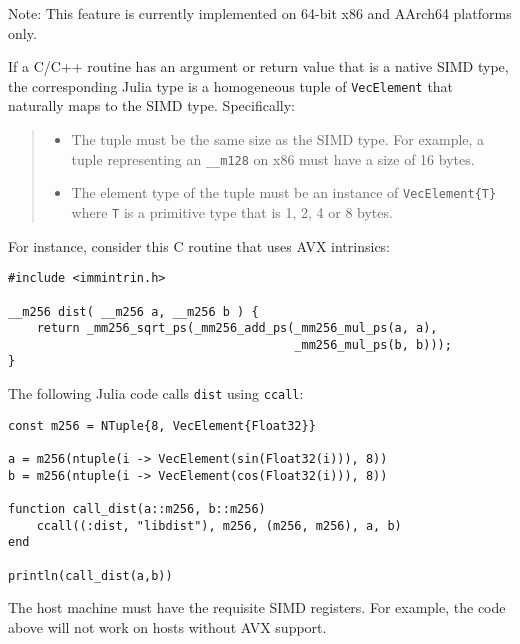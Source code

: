 Note: This feature is currently implemented on 64-bit x86 and AArch64 platforms only.



If a C/C++ routine has an argument or return value that is a native SIMD type, the corresponding Julia type is a homogeneous tuple of \texttt{VecElement} that naturally maps to the SIMD type.  Specifically:



\begin{quote}
\begin{itemize}
\item The tuple must be the same size as the SIMD type. For example, a tuple representing an \texttt{\_\_m128} on x86 must have a size of 16 bytes.


\item The element type of the tuple must be an instance of \texttt{VecElement\{T\}} where \texttt{T} is a primitive type that is 1, 2, 4 or 8 bytes.

\end{itemize}
\end{quote}


For instance, consider this C routine that uses AVX intrinsics:




\begin{lstlisting}
#include <immintrin.h>

__m256 dist( __m256 a, __m256 b ) {
    return _mm256_sqrt_ps(_mm256_add_ps(_mm256_mul_ps(a, a),
                                        _mm256_mul_ps(b, b)));
}
\end{lstlisting}



The following Julia code calls \texttt{dist} using \texttt{ccall}:




\begin{verbatim}
const m256 = NTuple{8, VecElement{Float32}}

a = m256(ntuple(i -> VecElement(sin(Float32(i))), 8))
b = m256(ntuple(i -> VecElement(cos(Float32(i))), 8))

function call_dist(a::m256, b::m256)
    ccall((:dist, "libdist"), m256, (m256, m256), a, b)
end

println(call_dist(a,b))
\end{verbatim}



The host machine must have the requisite SIMD registers.  For example, the code above will not work on hosts without AVX support.



